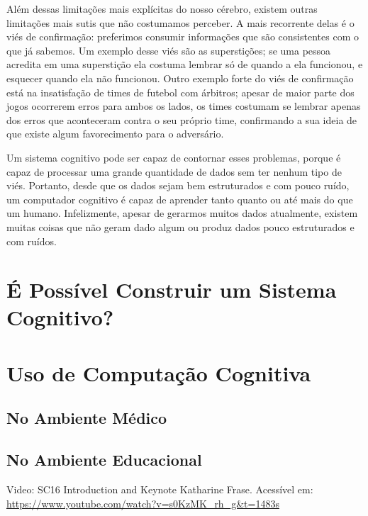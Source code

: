 \documentclass[12pt]{article}
\begin{document}
Além dessas limitações mais explícitas do nosso cérebro, existem outras
limitações mais sutis que não costumamos perceber. A mais recorrente 
delas é o viés de confirmação: preferimos consumir informações que são
consistentes com o que já sabemos. Um exemplo desse viés são as 
superstições; se uma pessoa acredita em uma superstição ela costuma
lembrar só de quando a ela funcionou, e esquecer quando ela
não funcionou. Outro exemplo forte do viés de confirmação está na 
insatisfação de times de futebol com árbitros; apesar de maior parte 
dos jogos ocorrerem erros para ambos os lados, os times costumam se
lembrar apenas dos erros que aconteceram contra o seu próprio time,
confirmando a sua ideia de que existe algum favorecimento para o 
adversário.

Um sistema cognitivo pode ser capaz de contornar esses problemas, porque
é capaz de processar uma grande quantidade de dados sem ter nenhum tipo
de viés. Portanto, desde que os dados sejam bem estruturados e com pouco
ruído, um computador cognitivo é capaz de aprender tanto quanto ou até
mais do que um humano. Infelizmente, apesar de gerarmos muitos dados 
atualmente, existem muitas coisas que não geram dado algum ou produz 
dados pouco estruturados e com ruídos.

\pagebreak
\section{É Possível Construir um Sistema Cognitivo?}

\pagebreak
\section{Uso de Computação Cognitiva}
\subsection{No Ambiente Médico}
\subsection{No Ambiente Educacional}


\pagebreak
\begin{thebibliography}{1}
 Video: SC16 Introduction and Keynote
    Katharine Frase. Acessível em: 
    \url{https://www.youtube.com/watch?v=s0KzMK_rh_g&t=1483s}
\end{thebibliography}
\end{document}
